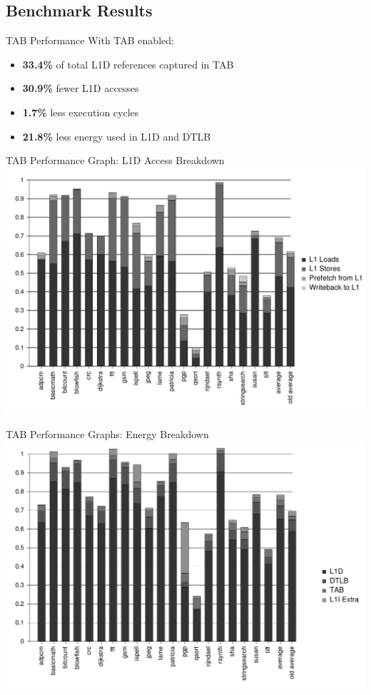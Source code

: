 \documentclass{beamer}
\begin{document}
\subsection{Benchmark Results}
\begin{frame}{TAB Performance}
   With TAB enabled:
   \begin{itemize}
      \item \textbf{33.4\%} of total L1D references captured in TAB
      \item \textbf{30.9\%} fewer L1D accesses
      \item \textbf{1.7\%} less execution cycles
      \item \textbf{21.8\%} less energy used in L1D and DTLB
   \end{itemize}
\end{frame}
\begin{frame}{TAB Performance Graph: L1D Access Breakdown}
   \includegraphics[width=\textwidth]{figures/dl1_access.pdf}
\end{frame}
\begin{frame}{TAB Performance Graphs: Energy Breakdown}
   \includegraphics[width=\textwidth]{figures/energy_e_stage.pdf}
\end{frame}
\end{document}
